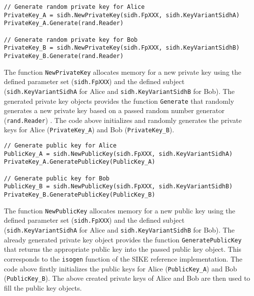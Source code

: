 
\begin{lstlisting}[]
// Generate random private key for Alice
PrivateKey_A = sidh.NewPrivateKey(sidh.FpXXX, sidh.KeyVariantSidhA)
PrivateKey_A.Generate(rand.Reader)

// Generate random private key for Bob
PrivateKey_B = sidh.NewPrivateKey(sidh.FpXXX, sidh.KeyVariantSidhB)
PrivateKey_B.Generate(rand.Reader)
\end{lstlisting}
The function \texttt{NewPrivateKey} allocates memory for a new private key using the defined parameter set (\texttt{sidh.FpXXX}) and the defined subject (\texttt{sidh.KeyVariantSidhA} for Alice and \texttt{sidh.KeyVariantSidhB} for Bob). The generated private key objects provides the function \texttt{Generate} that randomly generates a new private key based on a passed random number generator (\texttt{rand.Reader}) .
The code above initializes and randomly generates the private keys for Alice (\textcolor{keywordcol}{\texttt{PrivateKey\_A}}) and Bob (\textcolor{keywordcol}{\texttt{PrivateKey\_B}}).

\begin{lstlisting}[]
// Generate public key for Alice
PublicKey_A = sidh.NewPublicKey(sidh.FpXXX, sidh.KeyVariantSidhA)
PrivateKey_A.GeneratePublicKey(PublicKey_A)

// Generate public key for Bob
PublicKey_B = sidh.NewPublicKey(sidh.FpXXX, sidh.KeyVariantSidhB)
PrivateKey_B.GeneratePublicKey(PublicKey_B)
\end{lstlisting}
The function \texttt{NewPublicKey} allocates memory for a new public key using the defined parameter set (\texttt{sidh.FpXXX}) and the defined subject (\texttt{sidh.KeyVariantSidhA} for Alice and \texttt{sidh.KeyVariantSidhB} for Bob). The already generated private key object provides the function \texttt{GeneratePublicKey} that returns the appropriate public key into the passed public key object. This corresponds to the \texttt{isogen} function of the SIKE reference implementation.
The code above firstly initializes the public keys for Alice (\textcolor{keywordcol}{\texttt{PublicKey\_A}}) and Bob (\textcolor{keywordcol}{\texttt{PublicKey\_B}}). The above created private keys of Alice and Bob are then used to fill the public key objects.


